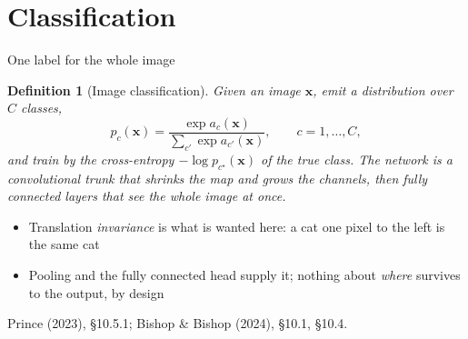 \documentclass[aspectratio=169, 11pt]{beamer}
\newtheorem{defx}[theorem]{Definition}
\newcommand{\srcline}[1]{%
  \par\vspace{0.25em}%
  {\scriptsize\color{mcMuted}\hfill #1\par}}
\begin{document}
\section{Classification}

\begin{frame}{One label for the whole image}
  \vspace{-0.4em}
  \begin{defx}[Image classification]\label{th:cls}
    \small
    Given an image $\mathbf{x}$, emit a distribution over $C$ classes,
    \[
      p_c(\mathbf{x}) = \frac{\exp a_c(\mathbf{x})}{\sum_{c'} \exp a_{c'}(\mathbf{x})},
      \qquad c = 1, \dots, C,
    \]
    and train by the cross-entropy $-\log p_{c^\star}(\mathbf{x})$ of the
    true class. The network is a convolutional \alert{trunk} that
    shrinks the map and grows the channels, then fully connected layers
    that see the whole image at once.
  \end{defx}
  \vspace{0.05em}
  {\footnotesize
  \begin{itemize}\itemsep0.18em
    \item Translation \emph{invariance} is what is wanted here: a cat
          one pixel to the left is the same cat
    \item Pooling and the fully connected head supply it; nothing about
          \emph{where} survives to the output, by design
  \end{itemize}}
  \vspace{-0.35em}
  \srcline{Prince (2023), \S10.5.1; Bishop \& Bishop (2024), \S10.1, \S10.4.}
\end{frame}
\end{document}
